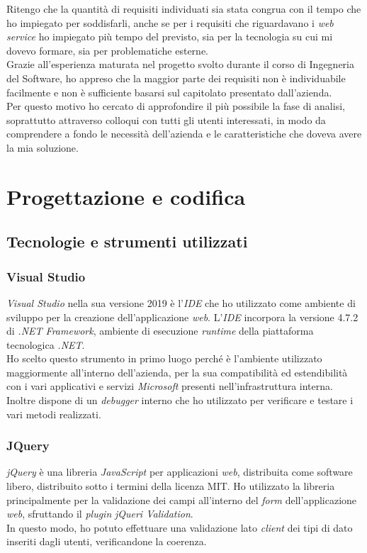 Ritengo che la quantità di requisiti individuati sia stata congrua con il tempo che ho impiegato per soddisfarli, anche se per i requisiti che riguardavano i \textit{web service} ho impiegato più tempo del previsto, sia per la tecnologia su cui mi dovevo formare, sia per problematiche esterne.\\
Grazie all'esperienza maturata nel progetto svolto durante il corso di Ingegneria del Software, ho appreso che la maggior parte dei requisiti non è individuabile facilmente e non è sufficiente basarsi sul capitolato presentato dall'azienda.\\
Per questo motivo ho cercato di approfondire il più possibile la fase di analisi, soprattutto attraverso colloqui con tutti gli utenti interessati, in modo da comprendere a fondo le necessità dell'azienda e le caratteristiche che doveva avere la mia soluzione.



\section{Progettazione e codifica}

\subsection{Tecnologie e strumenti utilizzati}

\subsubsection{Visual Studio}
\textit{Visual Studio} nella sua versione 2019 è l'\textit{IDE} che ho utilizzato come ambiente di sviluppo per la creazione dell'applicazione \textit{web}. L'\textit{IDE} incorpora la versione 4.7.2 di \textit{.NET Framework}, ambiente di esecuzione \textit{runtime} della piattaforma tecnologica \textit{.NET}.\\
Ho scelto questo strumento in primo luogo perché è l'ambiente utilizzato maggiormente all'interno dell'azienda, per la sua compatibilità ed estendibilità con i vari applicativi e servizi \textit{Microsoft} presenti nell'infrastruttura interna. Inoltre dispone di un \textit{debugger} interno che ho utilizzato per verificare e testare i vari metodi realizzati.

\subsubsection{JQuery}
\textit{jQuery} è una libreria \textit{JavaScript} per applicazioni \textit{web}, distribuita come software libero, distribuito sotto i termini della licenza MIT.
Ho utilizzato la libreria principalmente per la validazione dei campi all'interno del \textit{form} dell'applicazione \textit{web}, sfruttando il \textit{plugin} \textit{jQueri Validation}.\\
In questo modo, ho potuto effettuare una validazione lato \textit{client} dei tipi di dato inseriti dagli utenti, verificandone la coerenza.

